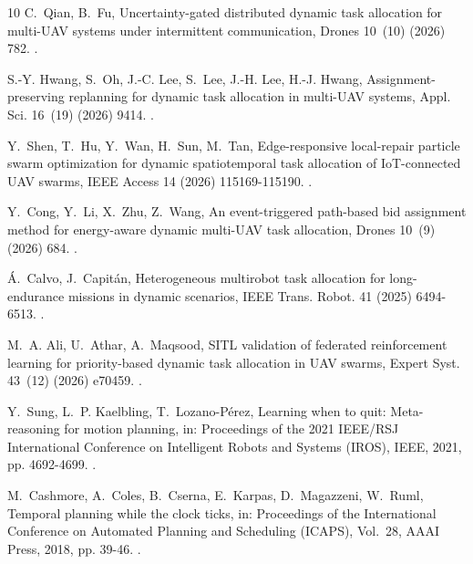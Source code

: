 \documentclass[a4paper,fleqn]{cas-dc}
\begin{document}
\begin{thebibliography}{10}
C.~Qian, B.~Fu, Uncertainty-gated distributed dynamic task allocation for
  multi-{UAV} systems under intermittent communication, Drones 10~(10) (2026)
  782.
\newblock \href {https://doi.org/10.3390/drones10100782}
  {}.

S.-Y. Hwang, S.~Oh, J.-C. Lee, S.~Lee, J.-H. Lee, H.-J. Hwang,
  Assignment-preserving replanning for dynamic task allocation in multi-{UAV}
  systems, Appl. Sci. 16~(19) (2026) 9414.
\newblock \href {https://doi.org/10.3390/app16199414}
  {}.

Y.~Shen, T.~Hu, Y.~Wan, H.~Sun, M.~Tan, Edge-responsive local-repair particle
  swarm optimization for dynamic spatiotemporal task allocation of
  {IoT}-connected {UAV} swarms, IEEE Access 14 (2026) 115169-115190.
\newblock \href {https://doi.org/10.1109/ACCESS.2026.3717031}
  {}.

Y.~Cong, Y.~Li, X.~Zhu, Z.~Wang, An event-triggered path-based bid assignment
  method for energy-aware dynamic multi-{UAV} task allocation, Drones 10~(9)
  (2026) 684.
\newblock \href {https://doi.org/10.3390/drones10090684}
  {}.

{\'A}.~Calvo, J.~Capit{\'a}n, Heterogeneous multirobot task allocation for
  long-endurance missions in dynamic scenarios, IEEE Trans. Robot. 41 (2025)
  6494-6513.
\newblock \href {https://doi.org/10.1109/TRO.2025.3626651}
  {}.

M.~A. Ali, U.~Athar, A.~Maqsood, {SITL} validation of federated reinforcement
  learning for priority-based dynamic task allocation in {UAV} swarms, Expert
  Syst. 43~(12) (2026) e70459.
\newblock \href {https://doi.org/10.1111/exsy.70459}
  {}.

Y.~Sung, L.~P. Kaelbling, T.~Lozano-P{\'e}rez, Learning when to quit:
  Meta-reasoning for motion planning, in: Proceedings of the 2021 IEEE/RSJ
  International Conference on Intelligent Robots and Systems (IROS), IEEE,
  2021, pp. 4692-4699.
\newblock \href {https://doi.org/10.1109/IROS51168.2021.9636864}
  {}.

M.~Cashmore, A.~Coles, B.~Cserna, E.~Karpas, D.~Magazzeni, W.~Ruml, Temporal
  planning while the clock ticks, in: Proceedings of the International
  Conference on Automated Planning and Scheduling (ICAPS), Vol.~28, AAAI Press,
  2018, pp. 39-46.
\newblock \href {https://doi.org/10.1609/icaps.v28i1.13878}
  {}.


\end{thebibliography}
\end{document}
